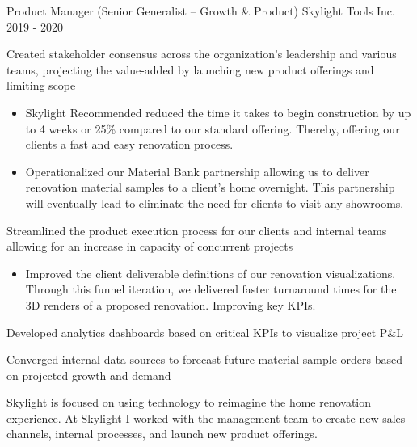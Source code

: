 \begin{cventries}

  \cventry
    {Product Manager (Senior Generalist – Growth \& Product)} %
    {Skylight Tools Inc.} %
    {} %
    {2019 - 2020} %
    {
    \begin{cvitems} %
        \item {Created stakeholder consensus across the organization’s leadership and various teams, projecting the value-added by launching new product offerings and limiting scope
            \begin{itemize}[leftmargin=*]
                \item {Skylight Recommended reduced the time it takes to begin construction by up to 4 weeks or 25\% compared to our standard offering. Thereby, offering our clients a fast and easy renovation process.}
                \item {Operationalized our Material Bank partnership allowing us to deliver renovation material samples to a client’s home overnight.
                \newline This partnership will eventually lead to eliminate the need for clients to visit any showrooms.}
            \end{itemize}
        \item {Streamlined the product execution process for our clients and internal teams allowing for an increase in capacity of concurrent projects
            \begin{itemize}[leftmargin=*]
                \item {Improved the client deliverable definitions of our renovation visualizations. Through this funnel iteration, we delivered faster turnaround times for the 3D renders of a proposed renovation. Improving key KPIs.}
            \end{itemize}}
        \item {Developed analytics dashboards based on critical KPIs to visualize project P\&L}
        \item {Converged internal data sources to forecast future material sample orders based on projected growth and demand}}
    \end{cvitems}
    }
    {
    \begin{cventrysummary}
    Skylight is focused on using technology to reimagine the home renovation experience. At Skylight I worked with the management team to create new sales channels, internal processes, and launch new product offerings.
    \end{cventrysummary}
    }
    

\end{cventries}
